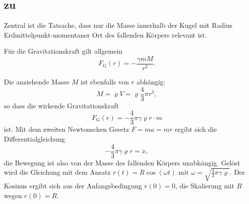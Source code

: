 \documentclass[a4paper]{scrartcl}
\begin{document}
\subsection{zu }
\label{lsg:Australien}
Zentral ist die Tatsache, dass nur die Masse innerhalb der Kugel mit Radius Erdmittelpunkt-momentaner Ort des fallenden Körpers relevant ist.

Für die Gravitationskraft gilt allgemein
\begin{equation*}
  F_\text{G}(r) = - \frac{\gamma mM}{r^2}.
\end{equation*}

Die anziehende Masse $M$ ist ebenfalls von $r$ abhängig:
\begin{equation*}
  M = \varrho V = \varrho \frac{4}{3} \pi  r^3,
\end{equation*}
so dass die wirkende Gravitationskraft 
\begin{equation*}
  F_\text{G}(r) = - \frac{4}{3} \pi \gamma \varrho r \cdot m
\end{equation*}
ist. Mit dem zweiten Newtonschen Gesetz $F = ma = m \ddot r$ ergibt sich die Differentialgleichung
\begin{equation*}
  - \frac{4}{3} \pi \gamma \varrho r = \ddot x,
\end{equation*}
die Bewegung ist also von der Masse des fallenden Körpers unabhängig. Gelöst wird die Gleichung mit dem Ansatz $r(t) = R \cos(\omega t)$ mit $\omega = \sqrt{\frac{4}{3}\pi\gamma\varrho}$. Der Kosinus ergibt sich aus der Anfangsbedingung $\dot r(0) = 0$, die Skalierung mit $R$ wegen $r(0) = R$.
\end{document}
